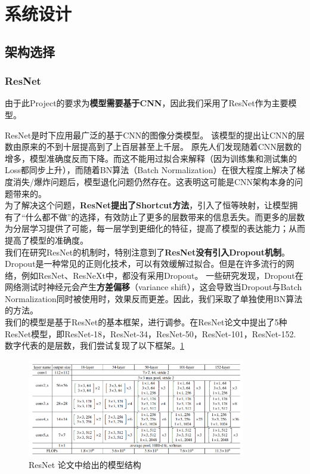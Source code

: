 \documentclass{article}
\theoremstyle{definition}
\begin{document}
\section{系统设计}
\subsection{架构选择}
\subsubsection{ResNet}
由于此Project的要求为\textbf{模型需要基于CNN}，因此我们采用了ResNet作为主要模型。

ResNet是时下应用最广泛的基于CNN的图像分类模型。\cite{he2015deep} 该模型的提出让CNN的层数由原来的不到十层提高到了上百层甚至上千层。
原先人们发现随着CNN层数的增多，模型准确度反而下降。而这不能用过拟合来解释（因为训练集和测试集的Loss都同步上升），而随着BN算法（Batch Normalization）在很大程度上解决了梯度消失/爆炸问题后\cite{batch}，模型退化问题仍然存在。这表明这可能是CNN架构本身的问题带来的。
\\ 
\indent
为了解决这个问题，\textbf{ResNet提出了Shortcut方法}，引入了恒等映射，让模型拥有了“什么都不做”的选择，有效防止了更多的层数带来的信息丢失。而更多的层数为分层学习提供了可能，每一层学到更细化的特征，提高了模型的表达能力；从而提高了模型的准确度。\cite{resnet2016}
\\ 
\indent
我们在研究ResNet的机制时，特别注意到了\textbf{ResNet没有引入Dropout机制}。Dropout是一种常见的正则化技术，可以有效缓解过拟合。\cite{dropout2014}但是在许多流行的网络，例如ResNet\cite{he2015deep}、ResNeXt\cite{xie2017aggregated}中，都没有采用Dropout。
一些研究发现，Dropout在网络测试时神经元会产生\textbf{方差偏移}（variance shift），这会导致当Dropout与Batch Normalization同时被使用时，效果反而更差。\cite{li2019understanding}因此，我们采取了单独使用BN算法的方法。
\\ 
\indent
我们的模型是基于ResNet的基本框架，进行调参。在ResNet论文\cite{he2015deep}中提出了5种ResNet模型，即ResNet-18，ResNet-34，ResNet-50，ResNet-101，ResNet-152. 数字代表的是层数，我们尝试复现了以下框架。\ref{Fig.resnet1}
\begin{figure}[h] %
	\centering %
	\includegraphics[width=0.85\textwidth]{resnet.png} %
	\caption{ResNet 论文中给出的模型结构} %
	\label{Fig.resnet1} %
\end{figure}
\end{document}

